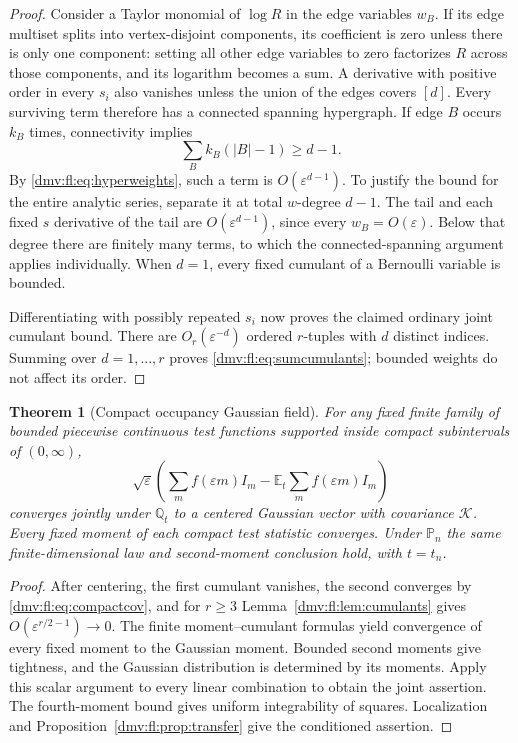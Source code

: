 \documentclass[11pt,letterpaper]{article}
\numberwithin{equation}{section}
\newtheorem{theorem}{Theorem}[section]
\theoremstyle{definition}\newtheorem{definition}[theorem]{Definition}
\theoremstyle{remark}\newtheorem{remark}[theorem]{Remark}
\newcommand{\E}{\mathbb E}
\newcommand{\Pp}{\mathbb P}
\newcommand{\Q}{\mathbb Q}
\newcommand{\eps}{\varepsilon}
\begin{document}
\begin{proof}
Consider a Taylor monomial of $\log R$ in the edge variables $w_B$.
If its edge multiset splits into vertex-disjoint components, its
coefficient is zero unless there is only one component: setting all
other edge variables to zero factorizes $R$ across those components,
and its logarithm becomes a sum. A derivative with positive order in
every $s_i$ also vanishes unless the union of the edges covers $[d]$.
Every surviving term therefore has a connected spanning hypergraph.
If edge $B$ occurs $k_B$ times, connectivity implies
\[
 \sum_B k_B(|B|-1)\ge d-1.
\]
By \eqref{dmv:fl:eq:hyperweights}, such a term is $O(\eps^{d-1})$.
To justify the bound for the entire analytic series, separate it at
total $w$-degree $d-1$. The tail and each fixed $s$ derivative of the
tail are $O(\eps^{d-1})$, since every $w_B=O(\eps)$. Below that degree
there are finitely many terms, to which the connected-spanning argument
applies individually. When $d=1$, every fixed cumulant of a Bernoulli
variable is bounded.

Differentiating with possibly repeated $s_i$ now proves the claimed
ordinary joint cumulant bound. There are $O_r(\eps^{-d})$ ordered
$r$-tuples with $d$ distinct indices. Summing over $d=1,\ldots,r$
proves \eqref{dmv:fl:eq:sumcumulants}; bounded weights do not affect its order.
\end{proof}

\begin{theorem}[Compact occupancy Gaussian field]\label{dmv:fl:thm:field}
For any fixed finite family of bounded piecewise continuous test
functions supported inside compact subintervals of $(0,\infty)$,
\[
 \sqrt\eps\left(\sum_mf(\eps m)I_m-
                     \E_t\sum_mf(\eps m)I_m\right)
\]
converges jointly under $\Q_t$ to a centered Gaussian vector with
covariance $\mathcal K$. Every fixed moment of each compact test
statistic converges. Under $\Pp_n$ the same finite-dimensional law and
second-moment conclusion hold, with $t=t_n$.
\end{theorem}
\begin{proof}
After centering, the first cumulant vanishes, the second converges by
\eqref{dmv:fl:eq:compactcov}, and for $r\ge3$ Lemma~\ref{dmv:fl:lem:cumulants} gives
$O(\eps^{r/2-1})\to0$. The finite moment--cumulant formulas yield
convergence of every fixed moment to the Gaussian moment. Bounded
second moments give tightness, and the Gaussian distribution is
determined by its moments. Apply this scalar argument to every linear
combination to obtain the joint assertion. The fourth-moment bound
gives uniform integrability of squares. Localization and
Proposition~\ref{dmv:fl:prop:transfer} give the conditioned assertion.
\end{proof}
\end{document}
